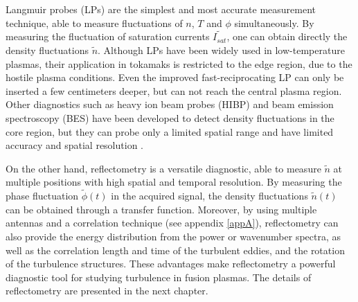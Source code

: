 Langmuir probes (LPs) are the simplest and most accurate measurement technique, able to measure fluctuations of $n$, $T$ and $\phi$ simultaneously. By measuring the fluctuation of saturation currents $\widetilde{I_{sat}}$, one can obtain directly the density fluctuations $\widetilde{n}$. Although LPs have been widely used in low-temperature plasmas, their application in tokamaks is restricted to the edge region, due to the hostile plasma conditions. Even the improved fast-reciprocating LP can only be inserted a few centimeters deeper, but can not reach the central plasma region. Other diagnostics such as heavy ion beam probes (HIBP) and beam emission spectroscopy (BES) have been developed to detect density fluctuations in the core region, but they can probe only a limited spatial range and have limited accuracy and spatial resolution \cite{Bretz_1997_RSI}.

On the other hand, reflectometry is a versatile diagnostic, able to measure $\widetilde{n}$ at multiple positions with high spatial and temporal resolution. By measuring the phase fluctuation $\widetilde{\phi}(t)$ in the acquired signal, the density fluctuations $\widetilde{n}(t)$ can be obtained through a transfer function. Moreover, by using multiple antennas and a correlation technique (see appendix \ref{appA}), reflectometry can also provide the energy distribution from the power or wavenumber spectra, as well as the correlation length and time of the turbulent eddies, and the rotation of the turbulence structures. These advantages make reflectometry a powerful diagnostic tool for studying turbulence in fusion plasmas. The details of reflectometry are presented in the next chapter.

